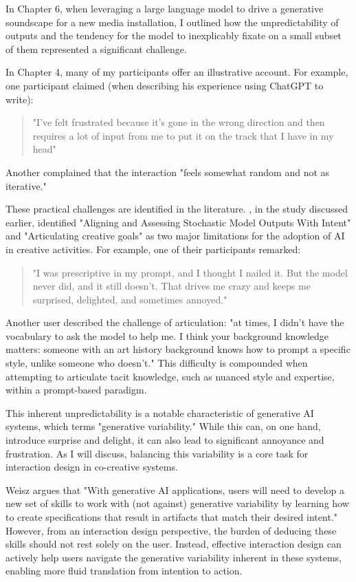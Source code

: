 In Chapter 6, when leveraging a large language model to drive a generative soundscape for a new media installation, I outlined how the unpredictability of outputs and the tendency for the model to inexplicably fixate on a small subset of them represented a significant challenge.

In Chapter 4, many of my participants offer an illustrative account. For example, one participant claimed (when describing his experience using ChatGPT to write):

\begin{quote}
    "I've felt frustrated because it's gone in the wrong direction and then requires a lot of input from me to put it on the track that I have in my head"
\end{quote}

Another complained that the interaction "feels somewhat random and not as iterative."

These practical challenges are identified in the literature. \cite{Palani2024-on}, in the study discussed earlier, identified "Aligning and Assessing Stochastic Model Outputs With Intent" and "Articulating creative goals" as two major limitations for the adoption of AI in creative activities. For example, one of their participants remarked:
\begin{quote}
"I was prescriptive in my prompt, and I thought I nailed it. But the model never did, and it still doesn't. That drives me crazy and keeps me surprised, delighted, and sometimes annoyed."
\end{quote}
Another user described the challenge of articulation: "at times, I didn't have the vocabulary to ask the model to help me. I think your background knowledge matters: someone with an art history background knows how to prompt a specific style, unlike someone who doesn't." This difficulty is compounded when attempting to articulate tacit knowledge, such as nuanced style and expertise, within a prompt-based paradigm.

This inherent unpredictability is a notable characteristic of generative AI systems, which \cite{Weisz2024-io} terms "generative variability." While this can, on one hand, introduce surprise and delight, it can also lead to significant annoyance and frustration. As I will discuss, balancing this variability is a core task for interaction design in co-creative systems.

Weisz argues that "With generative AI applications, users will need to develop a new set of skills to work with (not against) generative variability by learning how to create specifications that result in artifacts that match their desired intent." However, from an interaction design perspective, the burden of deducing these skills should not rest solely on the user. Instead, effective interaction design can actively help users navigate the generative variability inherent in these systems, enabling more fluid translation from intention to action.

